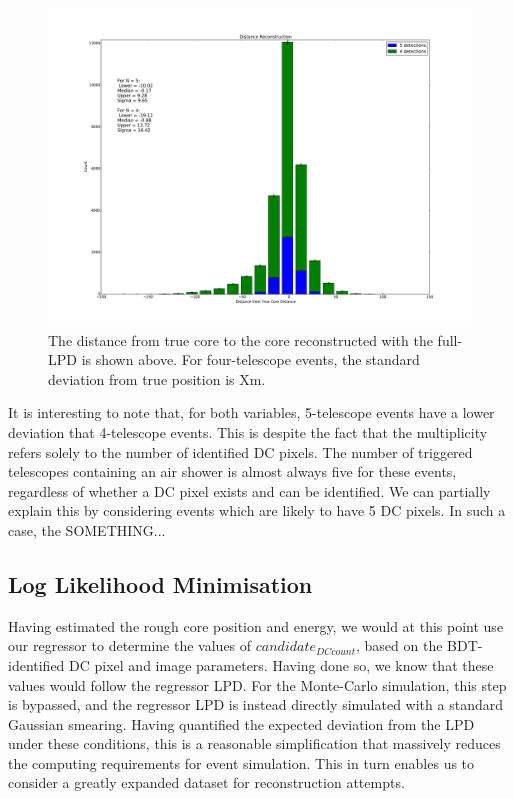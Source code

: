 \documentclass[11pt]{article}
\begin{document}
\begin{figure}
\begin{center}
\includegraphics[width=\textwidth]{rawcoredistance}
\caption{The distance from true core to the core reconstructed with the full-LPD is shown above. For four-telescope events, the standard deviation from true position is Xm. }
\label{fig:rawcoredistance}
\end{center}
\end{figure} 

It is interesting to note that, for both variables, 5-telescope events have a lower deviation that 4-telescope events. This is despite the fact that the multiplicity refers solely to the number of identified DC pixels. The number of triggered telescopes containing an air shower is almost always five for these events, regardless of whether a DC pixel exists and can be identified. We can partially explain this by considering events which are likely to have 5 DC pixels. In such a case, the SOMETHING...

\subsection{Log Likelihood Minimisation}
Having estimated the rough core position and energy, we would at this point use our regressor to determine the values of $candidate_{DCcount}$, based on the BDT-identified DC pixel and image parameters. Having done so, we know that these values would follow the regressor LPD. For the Monte-Carlo simulation, this step is bypassed, and the regressor LPD is instead directly simulated with a standard Gaussian smearing. Having quantified the expected deviation from the LPD under these conditions, this is a reasonable simplification that massively reduces the computing requirements for event simulation. This in turn enables us to consider a greatly expanded dataset for reconstruction attempts.
 
\end{document}
